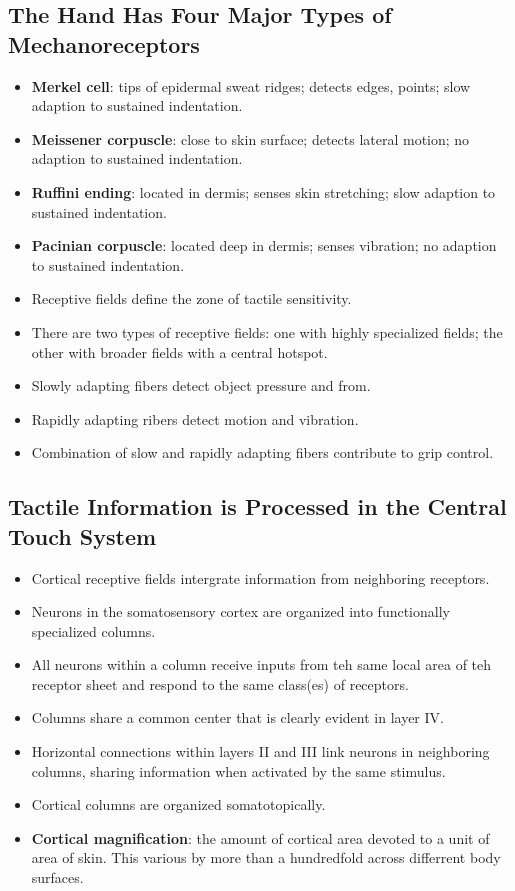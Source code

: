 \documentclass[12pt,a4paper]{article}
\begin{document}
\subsection{The Hand Has Four Major Types of Mechanoreceptors}
\begin{itemize}
    \item \textbf{Merkel cell}: tips of epidermal sweat ridges; detects edges, points; slow adaption to sustained indentation.
    \item \textbf{Meissener corpuscle}: close to skin surface; detects lateral motion; no adaption to sustained indentation.
    \item \textbf{Ruffini ending}: located in dermis; senses skin stretching; slow adaption to sustained indentation.
    \item \textbf{Pacinian corpuscle}: located deep in dermis; senses vibration; no adaption to sustained indentation. 
    \item Receptive fields define the zone of tactile sensitivity.
    \item There are two types of receptive fields: one with highly specialized fields; the other with broader fields with a central hotspot.
    \item Slowly adapting fibers detect object pressure and from.
    \item Rapidly adapting ribers detect motion and vibration.
    \item Combination of slow and rapidly adapting fibers contribute to grip control.
\end{itemize}

\subsection{Tactile Information is Processed in the Central Touch System}
\begin{itemize}
    \item Cortical receptive fields intergrate information from neighboring receptors.
    \item Neurons in the somatosensory cortex are organized into functionally specialized columns.
    \item All neurons within a column receive inputs from teh same local area of teh receptor sheet and respond to the same class(es) of receptors.
    \item Columns share a common center that is clearly evident in layer IV.
    \item Horizontal connections within layers II and III link neurons in neighboring columns, sharing information when activated by the same stimulus.
    \item Cortical columns are organized somatotopically.
    \item \textbf{Cortical magnification}: the amount of cortical area devoted to a unit of area of skin. This various by more than a hundredfold across differrent body surfaces.
\end{itemize}
\end{document}
